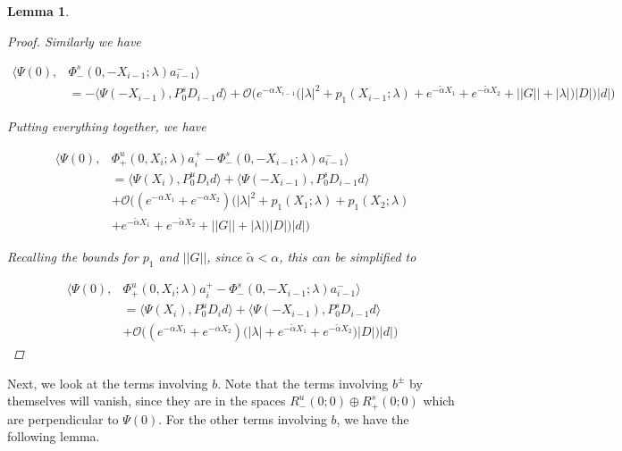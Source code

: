 \documentclass[12pt]{article}
\newtheorem{lemma}{Lemma}
\begin{document}
\begin{lemma}
\begin{proof}
Similarly we have

\begin{align*}
\langle \Psi(0), &\Phi^s_-(0, -X_{i-1}; \lambda)a_{i-1}^- \rangle \\
&= -\langle \Psi(-X_{i-1}), P^s_0 D_{i-1} d \rangle
+ \mathcal{O}\Big(e^{-\alpha X_{i-1}} \Big( |\lambda|^2  + p_1(X_{i-1}; \lambda) + e^{-\tilde{\alpha} X_1} +e^{-\tilde{\alpha} X_2} + ||G|| + |\lambda|)|D| \Big)|d| \Big)
\end{align*}

Putting everything together, we have

\begin{align*}
\langle \Psi(0), &\Phi^u_+(0, X_i; \lambda)a_i^+ - \Phi^s_-(0, -X_{i-1}; \lambda)a_{i-1}^- \rangle \\
&= \langle \Psi(X_i), P^u_0 D_i d \rangle + \langle \Psi(-X_{i-1}), P^s_0 D_{i-1} d \rangle \\
&+ \mathcal{O}\Big( (e^{-\alpha X_1} + e^{-\alpha X_2}) \Big( |\lambda|^2  + p_1(X_1; \lambda) + p_1(X_2; \lambda) \\
&+ e^{-\tilde{\alpha} X_1} + e^{-\tilde{\alpha} X_2} + ||G|| + |\lambda|)|D| \Big)|d| \Big)
\end{align*}

Recalling the bounds for $p_1$ and $||G||$, since $\tilde{\alpha} < \alpha$, this can be simplified to

\begin{align*}
\langle \Psi(0), &\Phi^u_+(0, X_i; \lambda)a_i^+ - \Phi^s_-(0, -X_{i-1}; \lambda)a_{i-1}^- \rangle \\
&= \langle \Psi(X_i), P^u_0 D_i d \rangle + \langle \Psi(-X_{i-1}), P^s_0 D_{i-1} d \rangle \\
&+ \mathcal{O}\Big( (e^{-\alpha X_1} + e^{-\alpha X_2}) \Big( |\lambda| + e^{-\tilde{\alpha} X_1} + e^{-\tilde{\alpha} X_2} )|D| \Big)|d| \Big)
\end{align*}

\end{proof}
\end{lemma}

Next, we look at the terms involving $b$. Note that the terms involving $b^\pm$ by themselves will vanish, since they are in the spaces $R^u_-(0; 0) \oplus R^s_+(0; 0)$ which are perpendicular to $\Psi(0)$. For the other terms involving $b$, we have the following lemma.

\end{document}
